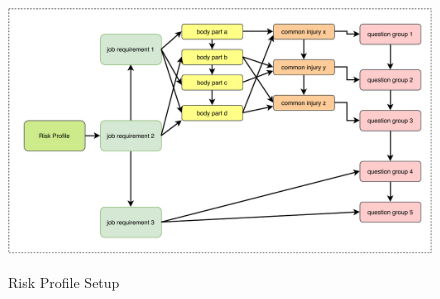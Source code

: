 \begin{figure}[!htb]
    \caption{Risk Profile Setup}
    \includegraphics[width=1\columnwidth]{fig/RiskProfile.pdf}
    \label{fig:riskprofile}
\end{figure}
